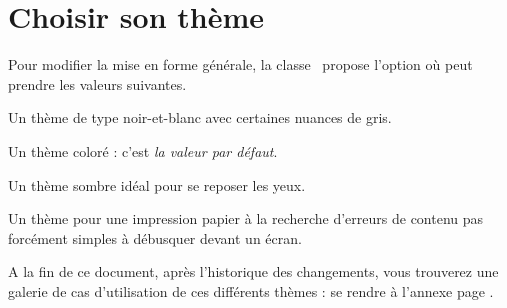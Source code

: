 \documentclass{../main/main}
\begin{document}
\section{Choisir son thème}

Pour modifier la mise en forme générale, la classe \thisproj\ propose l'option  où  peut prendre les valeurs suivantes.

\begin{center}
    \begin{minipage}{.925\linewidth}
        \begin{description}[wide]
            \item[bw]
            Un thème de type noir-et-blanc avec certaines nuances de gris.
        
            \item[color]
            Un thème coloré : c'est \emph{la valeur par défaut}.
        
            \item[dark]
            Un thème sombre idéal pour se reposer les yeux.
        
            \item[draft]
            Un thème pour une impression papier à la recherche d'erreurs de contenu pas forcément simples à débusquer devant un écran.
        \end{description}
    \end{minipage}
\end{center}


\begin{tdocnote}
    A la fin de ce document, après l'historique des changements, vous trouverez une galerie de cas d'utilisation de ces différents thèmes : se rendre à l'annexe page \pageref{tutodoc-theme-gallery}.
\end{tdocnote}
\end{document}
